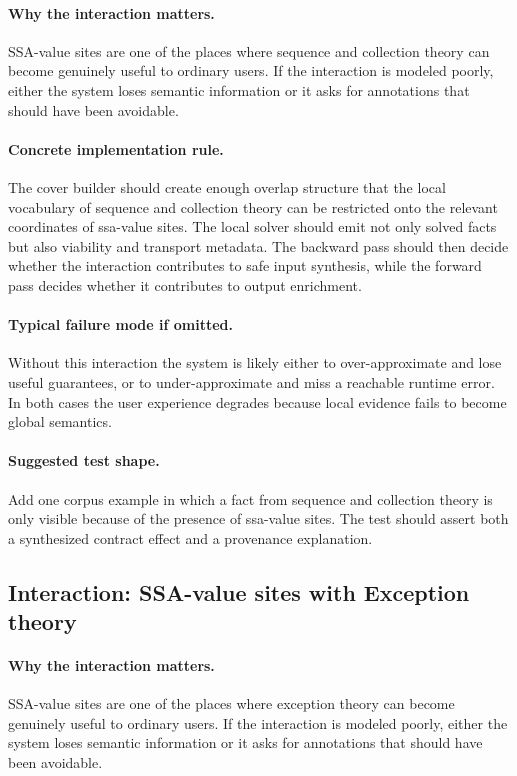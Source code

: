 \documentclass[11pt]{report}
\theoremstyle{definition}
\theoremstyle{plain}
\begin{document}
\paragraph{Why the interaction matters.}
SSA-value sites are one of the places where sequence and collection theory can become
genuinely useful to ordinary users. If the interaction is modeled poorly,
either the system loses semantic information or it asks for annotations that
should have been avoidable.

\paragraph{Concrete implementation rule.}
The cover builder should create enough overlap structure that the local
vocabulary of sequence and collection theory can be restricted onto the relevant
coordinates of ssa-value sites. The local solver should emit not only
solved facts but also viability and transport metadata. The backward pass
should then decide whether the interaction contributes to safe input
synthesis, while the forward pass decides whether it contributes to output
enrichment.

\paragraph{Typical failure mode if omitted.}
Without this interaction the system is likely either to over-approximate and
lose useful guarantees, or to under-approximate and miss a reachable runtime
error. In both cases the user experience degrades because local evidence
fails to become global semantics.

\paragraph{Suggested test shape.}
Add one corpus example in which a fact from sequence and collection theory is only
visible because of the presence of ssa-value sites. The test should
assert both a synthesized contract effect and a provenance explanation.

\subsection{Interaction: SSA-value sites with Exception theory}

\paragraph{Why the interaction matters.}
SSA-value sites are one of the places where exception theory can become
genuinely useful to ordinary users. If the interaction is modeled poorly,
either the system loses semantic information or it asks for annotations that
should have been avoidable.
\end{document}
